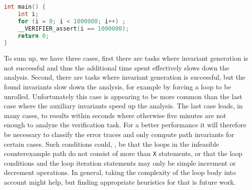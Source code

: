 \begin{lstlisting}[language=C, label=listing:easyinv, caption=The source code of \mbox{loop-new/count\_by\_1\_true-unreach-call.i}, float, captionpos=b, frame = single]
 int main() {
    int i;
    for (i = 0; i < 1000000; i++) ;
    __VERIFIER_assert(i == 1000000);
    return 0;
}
\end{lstlisting}

To sum up, we have three cases, first there are tasks where invariant generation is not successful and thus the additional time spent effectively slows down the analysis. Second, there are 
tasks where invariant generation is successful, but the found invariants slow down the analysis, for example by forcing a loop to be unrolled. Unfortunately this case is appearing to be more common than the 
last case where the auxiliary invariants speed up the analysis. The last case leads, in many cases, to results within seconds where otherwise five minutes are not enough to analyze the verification task.
For a better performance it will therefore be necessary to classify the error traces and only compute path invariants for certain cases. Such conditions could, \eg, be that the loops in the infeasible 
counterexample path do not consist of more than \texttt{X} statements, or that the loop conditions and the loop iteration statements may only be simple increment or decrement operations. In general, taking 
the complexity of the loop body into account might help, but finding appropriate heuristics for that is future work.